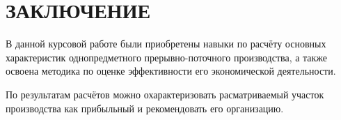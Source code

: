 \section*{ЗАКЛЮЧЕНИЕ}

В данной курсовой работе были приобретены навыки по расчёту основных 
характеристик однопредметного прерывно-поточного производства,
а также освоена методика по оценке эффективности его экономической 
деятельности. 

По результатам расчётов можно охарактеризовать расматриваемый участок производства
как прибыльный и рекомендовать его организацию.